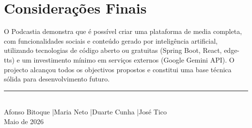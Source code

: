 \documentclass[12pt, a4paper]{report}
\begin{document}
\section{Considerações Finais}

O Podcastia demonstra que é possível criar uma plataforma de media completa,
com funcionalidades sociais e conteúdo gerado por inteligência artificial, utilizando
tecnologias de código aberto ou gratuitas (Spring Boot, React, edge-tts) e um investimento
mínimo em serviços externos (Google Gemini API). O projecto alcançou todos os
objectivos propostos e constitui uma base técnica sólida para desenvolvimento futuro.

\vspace{2cm}
\begin{center}
  \rule{8cm}{0.4pt}\\[0.3cm]
  {\small Afonso Bitoque \quad|\quad Maria Neto \quad|\quad Duarte Cunha \quad|\quad José Tico}\\
  {\small Maio de 2026}
\end{center}
\end{document}
